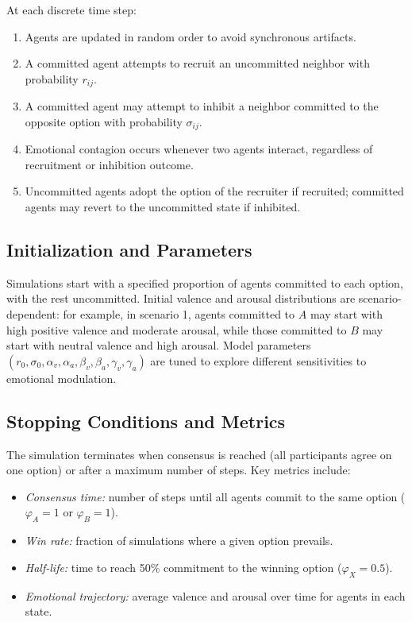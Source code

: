 \documentclass[a4paper,twoside]{article}
\begin{document}
At each discrete time step:
\begin{enumerate}
    \item Agents are updated in random order to avoid synchronous artifacts.
    \item A committed agent attempts to recruit an uncommitted neighbor with probability $r_{ij}$.
    \item A committed agent may attempt to inhibit a neighbor committed to the opposite option with probability $\sigma_{ij}$.
    \item Emotional contagion occurs whenever two agents interact, regardless of recruitment or inhibition outcome.
    \item Uncommitted agents adopt the option of the recruiter if recruited; committed agents may revert to the uncommitted state if inhibited.
\end{enumerate}

\subsection{Initialization and Parameters}

Simulations start with a specified proportion of agents committed to each option, with the rest uncommitted. Initial valence and arousal distributions are scenario-dependent: for example, in scenario 1, agents committed to $A$ may start with high positive valence and moderate arousal, while those committed to $B$ may start with neutral valence and high arousal. Model parameters $(r_0, \sigma_0, \alpha_v, \alpha_a, \beta_v, \beta_a, \gamma_v, \gamma_a)$ are tuned to explore different sensitivities to emotional modulation.

\subsection{Stopping Conditions and Metrics}

The simulation terminates when consensus is reached (all participants agree on one option) or after a maximum number of steps. Key metrics include:
\begin{itemize}
    \item \textit{Consensus time:} number of steps until all agents commit to the same option ($\varphi_A=1$ or $\varphi_B=1$).
    \item \textit{Win rate:} fraction of simulations where a given option prevails.
    \item \textit{Half-life:} time to reach 50\% commitment to the winning option ($\varphi_X=0.5$).
    \item \textit{Emotional trajectory:} average valence and arousal over time for agents in each state.
\end{itemize}
\end{document}
